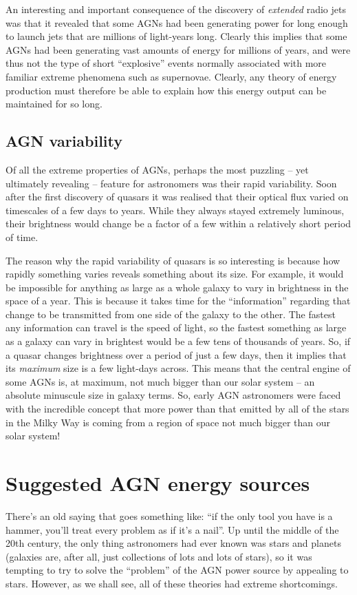 \documentclass[11pt]{article}
\begin{document}
An interesting and important consequence of the discovery of {\it
  extended} radio jets was that it revealed that some AGNs had been
generating power for long enough to launch jets that are millions of
light-years long. Clearly this implies that some AGNs had been
generating vast amounts of energy for millions of years, and were thus
not the type of short ``explosive'' events normally associated with
more familiar extreme phenomena such as supernovae. Clearly, any
theory of energy production must therefore be able to explain how this
energy output can be maintained for so long.

\subsection{AGN variability}
Of all the extreme properties of AGNs, perhaps the most puzzling --
yet ultimately revealing -- feature for astronomers was their rapid
variability. Soon after the first discovery of quasars it was realised
that their optical flux varied on timescales of a few days to
years. While they always stayed extremely luminous, their brightness
would change be a factor of a few within a relatively short period of
time.

The reason why the rapid variability of quasars is so interesting is
because how rapidly something varies reveals something about its
size. For example, it would be impossible for anything as large as a
whole galaxy to vary in brightness in the space of a year. This is
because it takes time for the ``information'' regarding that change to
be transmitted from one side of the galaxy to the other. The fastest
any information can travel is the speed of light, so the fastest
something as large as a galaxy can vary in brightest would be a few
tens of thousands of years. So, if a quasar changes brightness over a
period of just a few days, then it implies that its {\it maximum} size
is a few light-days across. This means that the central engine of
some AGNs is, at maximum, not much bigger than our solar system -- an
absolute minuscule size in galaxy terms. So, early AGN astronomers
were faced with the incredible concept that more power than that
emitted by all of the stars in the Milky Way is coming from a region
of space not much bigger than our solar system!

\section{Suggested AGN energy sources}
There's an old saying that goes something like: ``if the only tool you
have is a hammer, you'll treat every problem as if it's a nail''. Up
until the middle of the 20th century, the only thing astronomers had
ever known was stars and planets (galaxies are, after all, just
collections of lots and lots of stars), so it was tempting to try to
solve the ``problem'' of the AGN power source by appealing to
stars. However, as we shall see, all of these theories had extreme
shortcomings.
\end{document}
